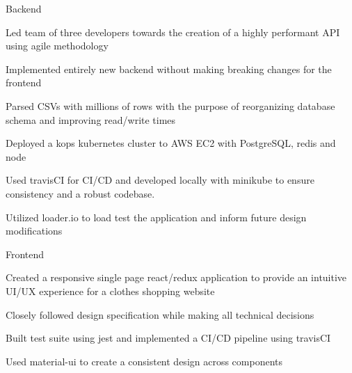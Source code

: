 
\begin{cventries}
  \cventry
    {} %
    {Backend} %
    {} %
    {} %
    {
      \begin{cvitems} %
        \item {Led team of three developers towards the creation of a highly performant API using agile methodology}
        \item {Implemented entirely new backend without making breaking changes for the frontend}
		\item {Parsed CSVs with millions of rows with the purpose of reorganizing database schema and improving read/write times}
		\item {Deployed a kops kubernetes cluster to AWS EC2 with PostgreSQL, redis and node}
    \item {Used travisCI for CI/CD and developed locally with minikube to ensure consistency and a robust codebase.}
    \item {Utilized loader.io to load test the application and inform future design modifications}
      \end{cvitems}
    }
  
  \cventry
    {} %
    {Frontend} %
    {} %
    {} %
    {
      \begin{cvitems} %
		\item {Created a responsive single page react/redux application to provide an intuitive UI/UX experience for a clothes shopping website}
		\item {Closely followed design specification while making all technical decisions}
		\item {Built test suite using jest and implemented a CI/CD pipeline using travisCI}
		\item {Used material-ui to create a consistent design across components}
      \end{cvitems}
    }

    

\end{cventries}
